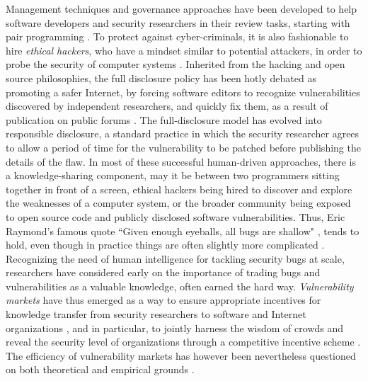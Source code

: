 Management techniques and governance approaches have been developed to help software developers and security researchers in their review tasks, starting with pair programming \cite{hulkko2005multiple}. To protect against cyber-criminals, it is also fashionable to hire {\it ethical hackers}, who have a mindset similar to potential attackers, in order to probe the security of computer systems \cite{smith2002ethical,saleem2006ethical,bishop2007penetration}. Inherited from the hacking and open source philosophies, the full disclosure policy has been hotly debated as promoting a safer Internet, by forcing software editors to recognize vulnerabilities discovered by independent researchers, and quickly fix them, as a result of publication on public forums \cite{arora2008optimal}. The full-disclosure model has evolved into responsible disclosure, a standard practice in which the security researcher agrees to allow a period of time for the vulnerability to be patched before publishing the details of the flaw. In most of these successful human-driven approaches, there is a knowledge-sharing component, may it be between two programmers sitting together in front of a screen, ethical hackers being hired to discover and explore the weaknesses of a computer system, or the broader community being exposed to open source code and publicly disclosed software vulnerabilities. Thus, Eric Raymond's famous quote ``Given enough eyeballs, all bugs are shallow" \cite{raymond1999cathedral}, tends to hold, even though in practice things are often slightly more complicated \cite{hafiz2015game}.\\

Recognizing the need of human intelligence for tackling security bugs at scale, researchers have considered early on the importance of trading bugs and vulnerabilities as a valuable knowledge, often earned the hard way. {\it Vulnerability markets} have thus emerged as a way to ensure appropriate incentives for knowledge transfer from security researchers to software and Internet organizations \cite{camp2004pricing}, and in particular, to jointly harness the wisdom of crowds and reveal the security level of organizations through a competitive incentive scheme \cite{schechter2002buy}. The efficiency of vulnerability markets has however been nevertheless questioned on both theoretical \cite{kannan2005market,mckinney2007vulnerability} and empirical grounds \cite{ransbotham2008markets,algarni2014software}.\\

